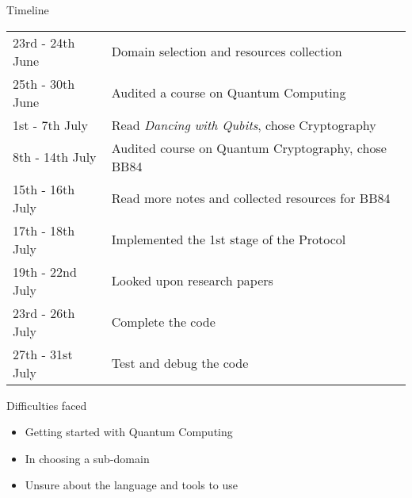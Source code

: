 \documentclass{beamer}
\begin{document}
\begin{frame}{Timeline}
    \begin{tabular}{ll}
            23rd - 24th June & Domain selection and resources collection\\
            25th - 30th June & Audited a course on Quantum Computing\\
            1st - 7th July & Read \emph{Dancing with Qubits}, chose Cryptography\\
            8th - 14th July & Audited course on Quantum Cryptography, chose BB84\\
            15th - 16th July & Read more notes and collected resources for BB84\\
            17th - 18th July & Implemented the 1st stage of the Protocol\\
            19th - 22nd July & Looked upon research papers\\
            23rd - 26th July & Complete the code\\
            27th - 31st July & Test and debug the code\\
     \end{tabular}
\end{frame}

\begin{frame}{Difficulties faced}
	\begin{itemize}
		\item Getting started with Quantum Computing
        \item In choosing a sub-domain
        \item Unsure about the language and tools to use
	\end{itemize}
\end{frame}
		
\end{document}
